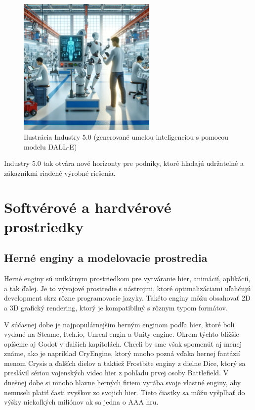 \begin{figure}[h]
\centering
\includegraphics[width=0.6\textwidth]{img/industry_5.0.png}
\caption{Ilustrácia Industry 5.0 (generované umelou inteligenciou s pomocou modelu DALL-E) \cite{kucera2024industry40}}
\label{fig:unrealengine5}
\end{figure}

Industry 5.0 tak otvára nové horizonty pre podniky, ktoré hľadajú udržateľné a zákazníkmi riadené výrobné riešenia. \cite{kucera2024industry40}

\section{Softvérové a hardvérové prostriedky}

\subsection{Herné enginy a modelovacie prostredia}

Herné enginy sú unikátnym prostriedkom pre vytváranie hier, animácií, aplikácií, a tak ďalej. Je to vývojové prostredie s nástrojmi, ktoré optimalizáciami uľahčujú development skrz rôzne programovacie jazyky. Takéto enginy môžu obsahovať 2D a 3D grafický rendering, ktorý je kompatibilný s rôznym typom formátov. \cite{arm_gaming_engines}

V súčasnej dobe je najpopulárnejším herným enginom podľa hier, ktoré boli vydané na Steame, Itch.io, Unreal engin a Unity engine. Okrem týchto bližšie opíšeme aj Godot v ďalších kapitolách. Chceli by sme však spomenúť aj menej známe, ako je napríklad CryEngine, ktorý mnoho pozná vďaka hernej fantázií menom Crysis a ďalších dielov a taktiež Frostbite enginy z dielne Dice, ktorý sa preslávil sériou vojenských video hier z pohľadu prvej osoby Battlefield. V dnešnej dobe si mnoho hlavne herných firiem vyrába svoje vlastné enginy, aby nemuseli platiť časti zvyškov zo svojich hier. Tieto čiastky sa môžu vyšplhať do výšky niekoľkých miliónov ak sa jedna o AAA hru. \cite{perforce2023gameengines}

